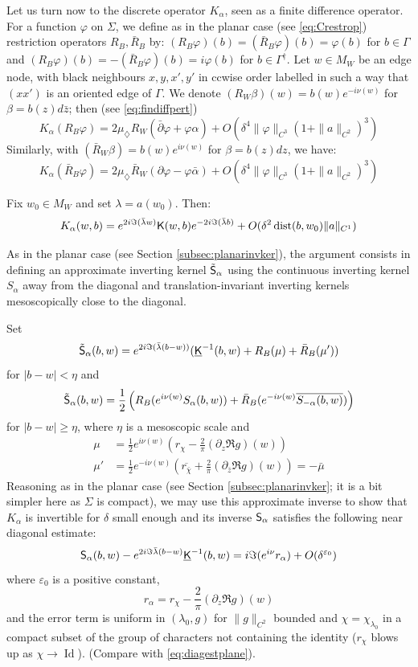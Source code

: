 \documentclass[10pt]{article}
\newcommand{\eps}{\varepsilon}
\newcommand{\rK}{{\sf K}}
\newcommand{\uK}{{\underline {\sf K}}}
\newcommand{\rS}{{\sf S}}
\DeclareMathOperator{\dist}{dist}
\newcommand{\dg}{\dagger}
\newcommand{\dmd}{\diamondsuit}
\newcommand{\dbar}{\bar\partial}
\DeclareMathOperator{\Id}{Id}
\begin{document}
Let us turn now to the discrete operator $K_\alpha$, seen as a finite difference operator. For a function $\varphi$ on $\Sigma$, we define as in the planar case (see \eqref{eq:Crestrop}) restriction operators $R_B,\bar R_B$ by: $(R_B\varphi)(b)=(\bar R_B\varphi)(b)=\varphi(b)$ for $b\in\Gamma$ and $(R_B\varphi)(b)=-(\bar R_B\varphi)(b)=i\varphi(b)$ for $b\in\Gamma^\dg$. Let $w\in M_W$ be an edge node, with black neighbours $x,y,x',y'$ in ccwise order labelled in such a way that $(xx')$ is an oriented edge of $\Gamma$. We denote $(R_W\beta)(w)=b(w)e^{-i\nu(w)}$ for $\beta=b(z)d\bar z$; then (see \eqref{eq:findiffpert})
$$K_\alpha(R_B\varphi)=2\mu_\dmd R_W(\dbar\varphi+\varphi\alpha)+O(\delta^4\|\varphi\|_{C^3}(1+\|a\|_{C^2})^3)$$
Similarly, with $(\bar R_{W}\beta)=b(w)e^{i\nu(w)}$ for $\beta=b(z)dz$, we have:
$$K_\alpha(\bar R_B\varphi)=2\mu_\dmd \bar R_W(\partial\varphi-\varphi\bar\alpha)
+O(\delta^4\|\varphi\|_{C^3}(1+\|a\|_{C^2})^3)$$

Fix $w_0\in M_W$ and set $\lambda=a(w_0)$. Then:
$$K_\alpha(w,b)=e^{2i\Im(\bar\lambda w)}\rK(w,b)e^{-2i\Im(\bar\lambda b)}+O(\delta^2\dist(b,w_0)\|a\|_{C^1})$$

As in the planar case (see Section \ref{subsec:planarinvker}), the argument consists in defining an approximate inverting kernel $\tilde\rS_\alpha$ using the continuous inverting kernel $S_\alpha$ away from the diagonal and translation-invariant inverting kernels mesoscopically  close to the diagonal.
 
Set 
$$\tilde \rS_\alpha(b,w)=e^{2i\Im(\bar\lambda (b-w))}(\uK^{-1}(b,w)+R_B(\mu)+\bar R_B(\mu'))$$ 
for $|b-w|<\eta$ and
$$\tilde \rS_\alpha(b,w)=\frac 12 \left(R_B(e^{i\nu(w)}S_\alpha(b,w))+\bar R_B(e^{-i\nu(w)}\overline {S_{-\alpha}(b,w)})\right)$$
for $|b-w|\geq\eta$, where $\eta$ is a mesoscopic scale and
%
%
%
%
%
%
%
%
%
\begin{align*}
\mu&=\frac 12 e^{i\nu(w)}(r_{\chi}-\frac {2}\pi(\partial_z\Re g)(w))\\
\mu'&=\frac 12 e^{-i\nu(w)}(\overline{r_{\bar\chi}}+\frac {2}\pi(\partial_{\bar z}\Re g)(w))=-\bar\mu
\end{align*}
%
%
%
%
%
%
%
%
%
Reasoning as in the planar case (see Section \ref{subsec:planarinvker}; it is a bit simpler here as $\Sigma$ is compact), we may use this approximate inverse to show that $K_\alpha$ is invertible for $\delta$ small enough and its inverse $\rS_\alpha$ satisfies the following near diagonal estimate:
\begin{equation}\label{eq:torusdiagest}
\rS_\alpha(b,w)-e^{2i\Im\bar\lambda(b-w)}\uK^{-1}(b,w)=i\Im(e^{i\nu}r_\alpha)+O(\delta^{\eps_0})
\end{equation}
where $\eps_0$ is a positive constant, 
\begin{equation}\label{eq:ralphator}
r_\alpha=r_{\chi}-\frac 2\pi(\partial_z\Re g)(w)
\end{equation}
and the error term is uniform in $(\lambda_0,g)$ for $\|g\|_{C^2}$ bounded and $\chi=\chi_{\lambda_0}$ in a compact subset of the group of characters not containing the identity ($r_\chi$ blows up as $\chi\rightarrow\Id$). (Compare with \eqref{eq:diagestplane}).
\end{document}
